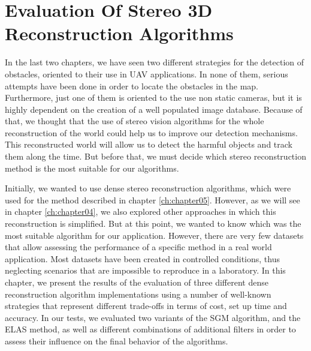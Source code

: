 \graphicspath{{./images/chapter03/bmps/}{./images/chapter03/vects/}{./images/chapter03/}}

\chapter{Evaluation Of Stereo 3D Reconstruction Algorithms}\label{ch:chapter03}

In the last two chapters, we have seen two different strategies for the detection of obstacles, oriented to their use in \ac{UAV} applications. In none of them, serious attempts have been done in order to locate the obstacles in the map. Furthermore, just one of them is oriented to the use non static cameras, but it is highly dependent on the creation of a well populated image database. Because of that, we thought that the use of stereo vision algorithms for the whole reconstruction of the world could help us to improve our detection mechanisms. This reconstructed world will allow us to detect the harmful objects and track them along the time. But before that, we must decide which stereo reconstruction method is the most suitable for our algorithms. 

Initially, we wanted to use dense stereo reconstruction algorithms, which were used for the method described in chapter \ref{ch:chapter05}. However, as we will see in chapter \ref{ch:chapter04}, we also explored other approaches in which this reconstruction is simplified. But at this point, we wanted to know which was the most suitable algorithm for our application. However, there are very few datasets that allow assessing the performance of a specific method in a real world application. Most datasets have been created in controlled conditions, thus neglecting scenarios that are impossible to reproduce in a laboratory. In this chapter, we present the results of the evaluation of three different dense reconstruction algorithm implementations using a number of well-known strategies that represent different trade-offs in terms of cost, set up time and accuracy. In our tests, we evaluated two variants of the \acf{SGM} algorithm, and the \acf{ELAS} method, as well as different combinations of additional filters in order to assess their influence on the final behavior of the algorithms.

